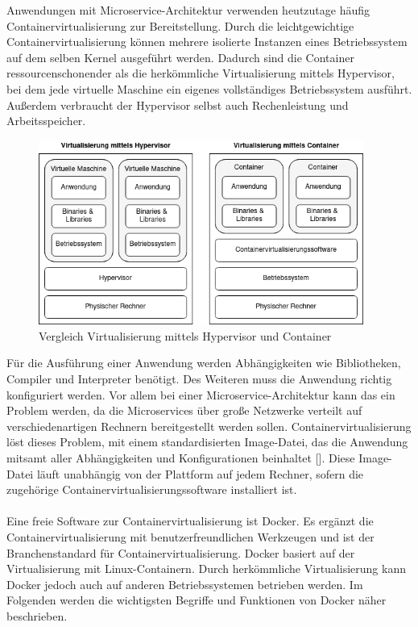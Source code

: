 Anwendungen mit Microservice-Architektur verwenden heutzutage häufig Containervirtualisierung zur Bereitstellung. Durch die leichtgewichtige Containervirtualisierung können mehrere isolierte Instanzen eines Betriebssystem auf dem selben Kernel ausgeführt werden. Dadurch sind die Container ressourcenschonender als die herkömmliche Virtualisierung mittels Hypervisor, bei dem jede virtuelle Maschine ein eigenes vollständiges Betriebssystem ausführt. Außerdem verbraucht der Hypervisor selbst auch Rechenleistung und Arbeitsspeicher.

\begin{figure}[H] 
    \centering
    \includegraphics[width=0.95\textwidth]{figures/containervirtualisierung.png}
    \caption{Vergleich Virtualisierung mittels Hypervisor und Container}
\end{figure}

Für die Ausführung einer Anwendung werden Abhängigkeiten wie Bibliotheken, Compiler und Interpreter benötigt. Des Weiteren muss die Anwendung richtig konfiguriert werden. Vor allem bei einer Microservice-Architektur kann das ein Problem werden, da die Microservices über große Netzwerke verteilt auf verschiedenartigen Rechnern bereitgestellt werden sollen. Containervirtualisierung löst dieses Problem, mit einem standardisierten Image-Datei, das die Anwendung mitsamt aller Abhängigkeiten und Konfigurationen beinhaltet [\cite[S. 9]{arundelCloud2019}]. Diese Image-Datei läuft unabhängig von der Plattform auf jedem Rechner, sofern die zugehörige Containervirtualisierungssoftware installiert ist. \\
\\
Eine freie Software zur Containervirtualisierung ist Docker. Es ergänzt die Containervirtualisierung mit benutzerfreundlichen Werkzeugen  und ist der Branchenstandard für Containervirtualisierung. Docker basiert auf der Virtualisierung mit Linux-Containern. Durch herkömmliche Virtualisierung kann Docker jedoch auch auf anderen Betriebssystemen betrieben werden. Im Folgenden werden die wichtigsten Begriffe und Funktionen von Docker näher beschrieben.

